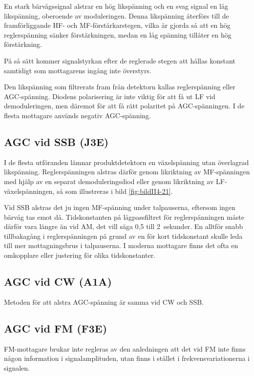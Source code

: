 En stark bärvågssignal alstrar en hög likspänning och en svag signal
en låg likspänning, oberoende av moduleringen.
Denna likspänning återförs till de framförliggande HF- och MF-förstärkarstegen,
vilka är gjorda så att en hög reglerspänning sänker förstärkningen, medan en
låg spänning tillåter en hög förstärkning.

På så sätt kommer signalstyrkan efter de reglerade stegen att hållas
konstant samtidigt som mottagarens ingång inte överstyrs.

Den likspänning som filtrerats fram från detektorn kallas reglerspänning eller
AGC-spänning.
Diodens polarisering är inte viktig för att få ut LF vid demoduleringen, men
däremot för att få rätt polaritet på AGC-spänningen.
I de flesta mottagare används negativ AGC-spänning.

\subsection{AGC vid SSB (J3E)}

I de flesta utföranden lämnar produktdetektorn en växelspänning utan
överlagrad likspänning.
Reglerspänningen alstras därför genom likriktning av MF-spänningen med hjälp
av en separat demoduleringsdiod eller genom likriktning av LF-växelspänningen,
så som illustreras i bild \ref{fig:bildII4-21}.

Vid SSB alstras det ju ingen MF-spänning under talpauserna, eftersom
ingen bärvåg tas emot då.
Tidskonstanten på lågpassfiltret för reglerspänningen måste därför vara längre
än vid AM, det vill säga 0,5 till 2~sekunder.
En alltför snabb tillbakagång i reglerspänningen på grund av en för kort
tidskonstant skulle leda till mer mottagningsbrus i talpauserna.
I moderna mottagare finns det ofta en omkopplare eller justering för olika
tidskonstanter.

\subsection{AGC vid CW (A1A)}

Metoden för att alstra AGC-spänning är samma vid CW och SSB.

\subsection{AGC vid FM (F3E)}

FM-mottagare brukar inte regleras av den anledningen att det vid FM
inte finns någon information i signalamplituden, utan finns i stället
i frekvensvariationerna i signalen.

